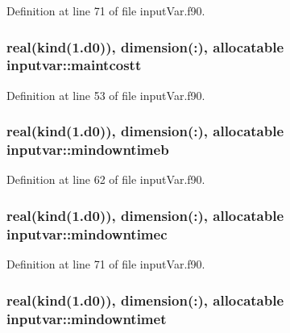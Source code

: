 Definition at line 71 of file input\-Var.\-f90.

\hypertarget{classinputvar_a59115307b83bfd1c0b1652c091e20b62}{
\subsubsection[{maintcostt}]{\setlength{\rightskip}{0pt plus 5cm}real(kind(1.d0)), dimension(\-:), allocatable inputvar\-::maintcostt}}\label{classinputvar_a59115307b83bfd1c0b1652c091e20b62}


Definition at line 53 of file input\-Var.\-f90.

\hypertarget{classinputvar_a09eb64b393df82105b2d57d6ed03b939}{
\subsubsection[{mindowntimeb}]{\setlength{\rightskip}{0pt plus 5cm}real(kind(1.d0)), dimension(\-:), allocatable inputvar\-::mindowntimeb}}\label{classinputvar_a09eb64b393df82105b2d57d6ed03b939}


Definition at line 62 of file input\-Var.\-f90.

\hypertarget{classinputvar_a08f7d764ab0f1da8ac516b769fe8d2e4}{
\subsubsection[{mindowntimec}]{\setlength{\rightskip}{0pt plus 5cm}real(kind(1.d0)), dimension(\-:), allocatable inputvar\-::mindowntimec}}\label{classinputvar_a08f7d764ab0f1da8ac516b769fe8d2e4}


Definition at line 71 of file input\-Var.\-f90.

\hypertarget{classinputvar_a80329f2c6a6631a2c21fadb194436b7c}{
\subsubsection[{mindowntimet}]{\setlength{\rightskip}{0pt plus 5cm}real(kind(1.d0)), dimension(\-:), allocatable inputvar\-::mindowntimet}}\label{classinputvar_a80329f2c6a6631a2c21fadb194436b7c}


